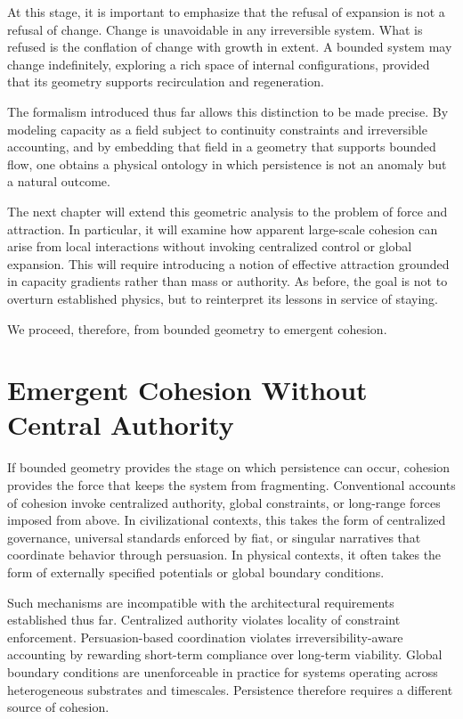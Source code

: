 \documentclass[12pt,oneside]{book}
\begin{document}
At this stage, it is important to emphasize that the refusal of expansion is not a refusal of change. Change is unavoidable in any irreversible system. What is refused is the conflation of change with growth in extent. A bounded system may change indefinitely, exploring a rich space of internal configurations, provided that its geometry supports recirculation and regeneration.

The formalism introduced thus far allows this distinction to be made precise. By modeling capacity as a field subject to continuity constraints and irreversible accounting, and by embedding that field in a geometry that supports bounded flow, one obtains a physical ontology in which persistence is not an anomaly but a natural outcome.

The next chapter will extend this geometric analysis to the problem of force and attraction. In particular, it will examine how apparent large-scale cohesion can arise from local interactions without invoking centralized control or global expansion. This will require introducing a notion of effective attraction grounded in capacity gradients rather than mass or authority. As before, the goal is not to overturn established physics, but to reinterpret its lessons in service of staying.

We proceed, therefore, from bounded geometry to emergent cohesion.

\chapter{Emergent Cohesion Without Central Authority}

If bounded geometry provides the stage on which persistence can occur, cohesion provides the force that keeps the system from fragmenting. Conventional accounts of cohesion invoke centralized authority, global constraints, or long-range forces imposed from above. In civilizational contexts, this takes the form of centralized governance, universal standards enforced by fiat, or singular narratives that coordinate behavior through persuasion. In physical contexts, it often takes the form of externally specified potentials or global boundary conditions.

Such mechanisms are incompatible with the architectural requirements established thus far. Centralized authority violates locality of constraint enforcement. Persuasion-based coordination violates irreversibility-aware accounting by rewarding short-term compliance over long-term viability. Global boundary conditions are unenforceable in practice for systems operating across heterogeneous substrates and timescales. Persistence therefore requires a different source of cohesion.
\end{document}
